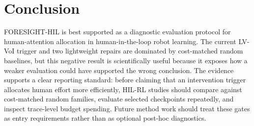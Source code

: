 \section{Conclusion}

FORESIGHT-HIL is best supported as a diagnostic evaluation protocol for human-attention allocation in human-in-the-loop robot learning. The current LV-VoI trigger and two lightweight repairs are dominated by cost-matched random baselines, but this negative result is scientifically useful because it exposes how a weaker evaluation could have supported the wrong conclusion. The evidence supports a clear reporting standard: before claiming that an intervention trigger allocates human effort more efficiently, HIL-RL studies should compare against cost-matched random families, evaluate selected checkpoints repeatedly, and inspect trace-level budget spending. Future method work should treat these gates as entry requirements rather than as optional post-hoc diagnostics.
